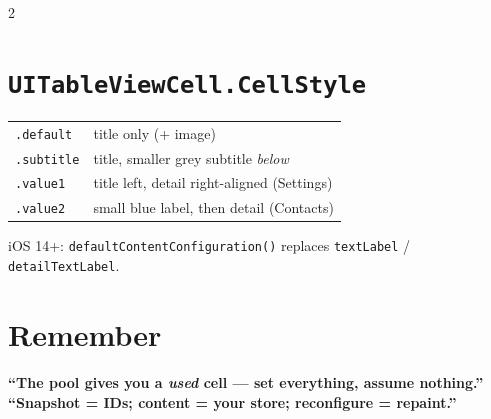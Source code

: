 \documentclass[8pt]{extarticle}
\begin{document}
\begin{multicols}{2}
\section{\texttt{UITableViewCell.CellStyle}}
{\footnotesize
\begin{tabular}{@{}l l@{}}
\toprule
\texttt{.default} & title only (+ image) \\
\texttt{.subtitle} & title, smaller grey subtitle \emph{below} \\
\texttt{.value1} & title left, detail right-aligned (Settings) \\
\texttt{.value2} & small blue label, then detail (Contacts) \\
\bottomrule
\end{tabular}}\pdfonly{\\[1pt]}
{\scriptsize iOS 14+: \texttt{defaultContentConfiguration()} replaces \texttt{textLabel} /
\texttt{detailTextLabel}.}

\section{Remember}
\textbf{``The pool gives you a \emph{used} cell — set everything, assume nothing.''}
\textbf{``Snapshot = IDs; content = your store; reconfigure = repaint.''}


\end{multicols}

\end{document}
